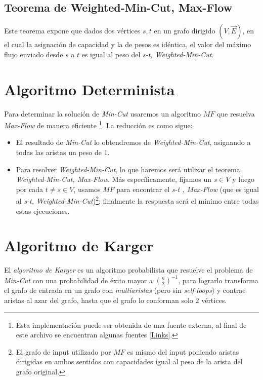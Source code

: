 \documentclass[dcc,uchile]{fcfmcourse}
\begin{document}
\subsection*{Teorema de Weighted-Min-Cut, Max-Flow}
Este teorema expone que dados dos vértices $s,t$ en un grafo dirigido $(V,\vec{E})$, en el cual la asignación de capacidad y la de pesos es idéntica, el valor del máximo flujo enviado desde $s$ a $t$ es igual al peso del \textit{s-t, Weighted-Min-Cut}.
\section{Algoritmo Determinista}
Para determinar la solución de \textit{Min-Cut} usaremos un algoritmo $MF$ que resuelva \textit{Max-Flow} de manera eficiente \footnote{Esta implementación puede ser obtenida de una fuente externa, al final de este archivo se encuentran algunas fuentes \ref{Links}.}. La reducción es como sigue: 
\begin{itemize}
    \item El resultado de \textit{Min-Cut} lo obtendremos de \textit{Weighted-Min-Cut}, asignando a todas las aristas un peso de $1$.
    \item Para resolver \textit{Weighted-Min-Cut}, lo que haremos será utilizar el teorema \textit{Weighted-Min-Cut, Max-Flow}. Más específicamente, fijamos un $s\in V$ y luego por cada $t\not = s\in V$, usamos $MF$ para encontrar el \textit{s-t , Max-Flow} (que es igual al \textit{s-t, Weighted-Min-Cut})\footnote{El grafo de input utilizado por $MF$ es mismo del input poniendo aristas dirigidas en ambos sentidos con capacidades igual al peso de la arista del grafo original.}; finalmente la respuesta será el mínimo entre todas estas ejecuciones.
\end{itemize}

\section{Algoritmo de Karger}
El \textit{algoritmo de Karger} es un algoritmo probabilista que resuelve el problema de \textit{Min-Cut} con una probabilidad de éxito mayor a $\binom{n}{2}^{-1}$, para lograrlo transforma el grafo de entrada en un grafo con \textit{multiaristas} (pero sin \textit{self-loops}) y contrae aristas al azar del grafo, hasta que el grafo lo conforman solo $2$ vértices.\
\end{document}

